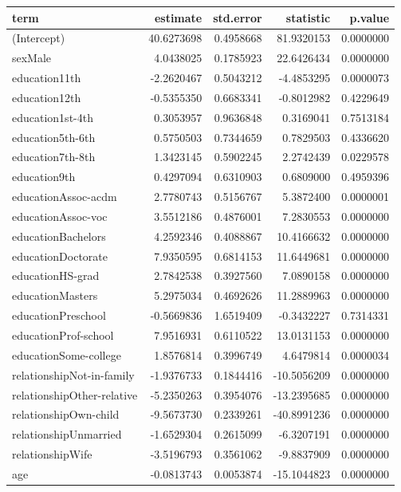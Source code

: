 \documentclass[]{article}
\begin{document}
\begin{table}[H]
\centering
\begin{tabular}{l|r|r|r|r}
\hline
term & estimate & std.error & statistic & p.value\\
\hline
(Intercept) & 40.6273698 & 0.4958668 & 81.9320153 & 0.0000000\\
\hline
sexMale & 4.0438025 & 0.1785923 & 22.6426434 & 0.0000000\\
\hline
education11th & -2.2620467 & 0.5043212 & -4.4853295 & 0.0000073\\
\hline
education12th & -0.5355350 & 0.6683341 & -0.8012982 & 0.4229649\\
\hline
education1st-4th & 0.3053957 & 0.9636848 & 0.3169041 & 0.7513184\\
\hline
education5th-6th & 0.5750503 & 0.7344659 & 0.7829503 & 0.4336620\\
\hline
education7th-8th & 1.3423145 & 0.5902245 & 2.2742439 & 0.0229578\\
\hline
education9th & 0.4297094 & 0.6310903 & 0.6809000 & 0.4959396\\
\hline
educationAssoc-acdm & 2.7780743 & 0.5156767 & 5.3872400 & 0.0000001\\
\hline
educationAssoc-voc & 3.5512186 & 0.4876001 & 7.2830553 & 0.0000000\\
\hline
educationBachelors & 4.2592346 & 0.4088867 & 10.4166632 & 0.0000000\\
\hline
educationDoctorate & 7.9350595 & 0.6814153 & 11.6449681 & 0.0000000\\
\hline
educationHS-grad & 2.7842538 & 0.3927560 & 7.0890158 & 0.0000000\\
\hline
educationMasters & 5.2975034 & 0.4692626 & 11.2889963 & 0.0000000\\
\hline
educationPreschool & -0.5669836 & 1.6519409 & -0.3432227 & 0.7314331\\
\hline
educationProf-school & 7.9516931 & 0.6110522 & 13.0131153 & 0.0000000\\
\hline
educationSome-college & 1.8576814 & 0.3996749 & 4.6479814 & 0.0000034\\
\hline
relationshipNot-in-family & -1.9376733 & 0.1844416 & -10.5056209 & 0.0000000\\
\hline
relationshipOther-relative & -5.2350263 & 0.3954076 & -13.2395685 & 0.0000000\\
\hline
relationshipOwn-child & -9.5673730 & 0.2339261 & -40.8991236 & 0.0000000\\
\hline
relationshipUnmarried & -1.6529304 & 0.2615099 & -6.3207191 & 0.0000000\\
\hline
relationshipWife & -3.5196793 & 0.3561062 & -9.8837909 & 0.0000000\\
\hline
age & -0.0813743 & 0.0053874 & -15.1044823 & 0.0000000\\
\hline
\end{tabular}
\end{table}
\end{document}
